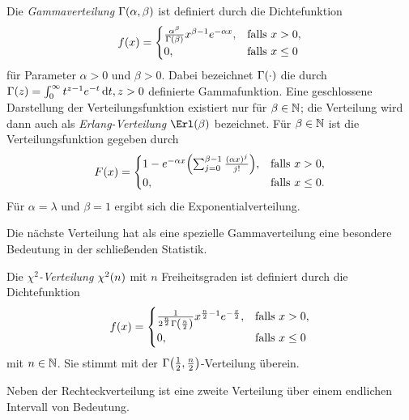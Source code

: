 \documentclass{lecture}
\begin{document}
    \begin{definition}
        Die \emph{Gammaverteilung} \(\Gamma\parentheses*{\alpha, \beta}\) ist definiert durch die Dichtefunktion
        \[
            f\parentheses*{x} = \begin{cases}
                \frac{\alpha^\beta}{\Gamma\parentheses*{\beta}}x^{\beta - 1}e^{-\alpha x}, & \text{falls }x > 0,\\
                0, & \text{falls }x \le 0
            \end{cases}
        \]
        für Parameter \(\alpha > 0\) und \(\beta > 0\).
        Dabei bezeichnet \(\Gamma\parentheses*{\cdot}\) die durch \(\Gamma\parentheses*{z} = \int_0^\infty t^{z - 1}e^{-t}\d t, z > 0\) definierte Gammafunktion.
        Eine geschlossene Darstellung der Verteilungsfunktion existiert nur für \(\beta \in \mathbb{N}\); die Verteilung wird dann auch als \emph{Erlang-Verteilung} \(\Erl\parentheses*{\beta}\) bezeichnet.
        Für \(\beta \in \mathbb{N}\) ist die Verteilungsfunktion gegeben durch
        \[
            F\parentheses*{x} = \begin{cases}
                1 - e^{-\alpha x}\parentheses*{\sum_{j = 0}^{\beta - 1}\frac{\parentheses*{\alpha x}^j}{j!}}, & \text{falls }x > 0,\\
                0, & \text{falls }x \le 0.
            \end{cases}
        \]
        Für \(\alpha = \lambda\) und \(\beta = 1\) ergibt sich die Exponentialverteilung.
    \end{definition}

    Die nächste Verteilung hat als eine spezielle Gammaverteilung eine besondere Bedeutung in der schließenden Statistik.

    \begin{definition}
        Die \emph{\(\chi^2\)-Verteilung} \(\chi^2\parentheses*{n}\) mit \(n\) Freiheitsgraden ist definiert durch die Dichtefunktion
        \[
            f\parentheses*{x} = \begin{cases}
                \frac{1}{2^{\frac{n}{2}}\Gamma\parentheses*{\frac{n}{2}}}x^{\frac{n}{2} - 1}e^{-\frac{x}{2}}, & \text{falls }x > 0,\\
                0, & \text{falls }x \le 0
            \end{cases}
        \]
        mit \(n \in \mathbb{N}\).
        Sie stimmt mit der \(\Gamma\parentheses*{\frac{1}{2}, \frac{n}{2}}\)-Verteilung überein.
    \end{definition}

    Neben der Rechteckverteilung ist eine zweite Verteilung über einem endlichen Intervall von Bedeutung.
\end{document}
